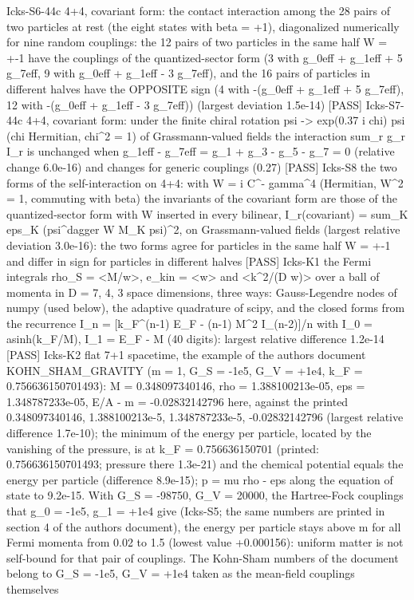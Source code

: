 \documentclass[
  10pt,
]{article}
\newenvironment{Shaded}{}{}
\newcommand{\NormalTok}[1]{#1}
\begin{document}
\begin{Shaded}
\begin{Highlighting}[]
\NormalTok{[PASS] Icks{-}S6{-}44c  4+4, covariant form: the contact interaction among the 28 pairs of two particles at rest (the eight states with beta = +1), diagonalized numerically for nine random couplings: the 12 pairs of two particles in the same half W = +{-}1 have the couplings of the quantized{-}sector form (3 with g\_0eff + g\_1eff + 5 g\_7eff, 9 with g\_0eff + g\_1eff {-} 3 g\_7eff), and the 16 pairs of particles in different halves have the OPPOSITE sign (4 with {-}(g\_0eff + g\_1eff + 5 g\_7eff), 12 with {-}(g\_0eff + g\_1eff {-} 3 g\_7eff)) (largest deviation 1.5e{-}14)}
\NormalTok{[PASS] Icks{-}S7{-}44c  4+4, covariant form: under the finite chiral rotation psi {-}\textgreater{} exp(0.37 i chi) psi (chi Hermitian, chi\^{}2 = 1) of Grassmann{-}valued fields the interaction sum\_r g\_r I\_r is unchanged when g\_1eff {-} g\_7eff = g\_1 + g\_3 {-} g\_5 {-} g\_7 = 0 (relative change 6.0e{-}16) and changes for generic couplings (0.27)}
\NormalTok{[PASS] Icks{-}S8  the two forms of the self{-}interaction on 4+4: with W = i C\^{}{-} gamma\^{}4 (Hermitian, W\^{}2 = 1, commuting with beta) the invariants of the covariant form are those of the quantized{-}sector form with W inserted in every bilinear, I\_r(covariant) = sum\_K eps\_K (psi\^{}dagger W M\_K psi)\^{}2, on Grassmann{-}valued fields (largest relative deviation 3.0e{-}16): the two forms agree for particles in the same half W = +{-}1 and differ in sign for particles in different halves}
\NormalTok{[PASS] Icks{-}K1  the Fermi integrals rho\_S = \textless{}M/w\textgreater{}, e\_kin = \textless{}w\textgreater{} and \textless{}k\^{}2/(D w)\textgreater{} over a ball of momenta in D = 7, 4, 3 space dimensions, three ways: Gauss{-}Legendre nodes of numpy (used below), the adaptive quadrature of scipy, and the closed forms from the recurrence I\_n = [k\_F\^{}(n{-}1) E\_F {-} (n{-}1) M\^{}2 I\_(n{-}2)]/n with I\_0 = asinh(k\_F/M), I\_1 = E\_F {-} M (40 digits): largest relative difference 1.2e{-}14}
\NormalTok{[PASS] Icks{-}K2  flat 7+1 spacetime, the example of the author\textquotesingle{}s document KOHN\_SHAM\_GRAVITY (m = 1, G\_S = {-}1e5, G\_V = +1e4, k\_F = 0.756636150701493): M = 0.348097340146, rho = 1.388100213e{-}05, eps = 1.348787233e{-}05, E/A {-} m = {-}0.02832142796 here, against the printed 0.348097340146, 1.388100213e{-}5, 1.348787233e{-}5, {-}0.02832142796 (largest relative difference 1.7e{-}10); the minimum of the energy per particle, located by the vanishing of the pressure, is at k\_F = 0.756636150701 (printed: 0.756636150701493; pressure there 1.3e{-}21) and the chemical potential equals the energy per particle (difference 8.9e{-}15); p = mu rho {-} eps along the equation of state to 9.2e{-}15. With G\_S = {-}98750, G\_V = 20000, the Hartree{-}Fock couplings that g\_0 = {-}1e5, g\_1 = +1e4 give (Icks{-}S5; the same numbers are printed in section 4 of the author\textquotesingle{}s document), the energy per particle stays above m for all Fermi momenta from 0.02 to 1.5 (lowest value +0.000156): uniform matter is not self{-}bound for that pair of couplings. The Kohn{-}Sham numbers of the document belong to G\_S = {-}1e5, G\_V = +1e4 taken as the mean{-}field couplings themselves}

\end{Highlighting}
\end{Shaded}
\end{document}
